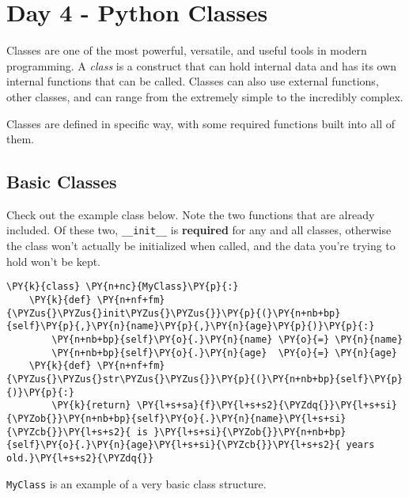\chapter{Day 4 - Python Classes}
Classes are one of the most powerful, versatile, and useful tools in
modern programming. A \emph{class} is a construct that can hold internal
data and has its own internal functions that can be called. Classes can
also use external functions, other classes, and can range from the
extremely simple to the incredibly complex.

Classes are defined in specific way, with some required functions built
into all of them.

\section{Basic Classes}

Check out the example class below. Note the two functions that are
already included. Of these two, \texttt{\_\_init\_\_} is
\textbf{required} for any and all classes, otherwise the class won't
actually be initialized when called, and the data you're trying to hold
won't be kept.

    \begin{tcolorbox}[breakable, size=fbox, boxrule=1pt, pad at break*=1mm,colback=cellbackground, colframe=cellborder]
\begin{Verbatim}[commandchars=\\\{\}]
\PY{k}{class} \PY{n+nc}{MyClass}\PY{p}{:}
    \PY{k}{def} \PY{n+nf+fm}{\PYZus{}\PYZus{}init\PYZus{}\PYZus{}}\PY{p}{(}\PY{n+nb+bp}{self}\PY{p}{,}\PY{n}{name}\PY{p}{,}\PY{n}{age}\PY{p}{)}\PY{p}{:}
        \PY{n+nb+bp}{self}\PY{o}{.}\PY{n}{name} \PY{o}{=} \PY{n}{name}
        \PY{n+nb+bp}{self}\PY{o}{.}\PY{n}{age}  \PY{o}{=} \PY{n}{age}
    \PY{k}{def} \PY{n+nf+fm}{\PYZus{}\PYZus{}str\PYZus{}\PYZus{}}\PY{p}{(}\PY{n+nb+bp}{self}\PY{p}{)}\PY{p}{:}
        \PY{k}{return} \PY{l+s+sa}{f}\PY{l+s+s2}{\PYZdq{}}\PY{l+s+si}{\PYZob{}}\PY{n+nb+bp}{self}\PY{o}{.}\PY{n}{name}\PY{l+s+si}{\PYZcb{}}\PY{l+s+s2}{ is }\PY{l+s+si}{\PYZob{}}\PY{n+nb+bp}{self}\PY{o}{.}\PY{n}{age}\PY{l+s+si}{\PYZcb{}}\PY{l+s+s2}{ years old.}\PY{l+s+s2}{\PYZdq{}}
\end{Verbatim}
\end{tcolorbox}

    \texttt{MyClass} is an example of a very basic class structure.

